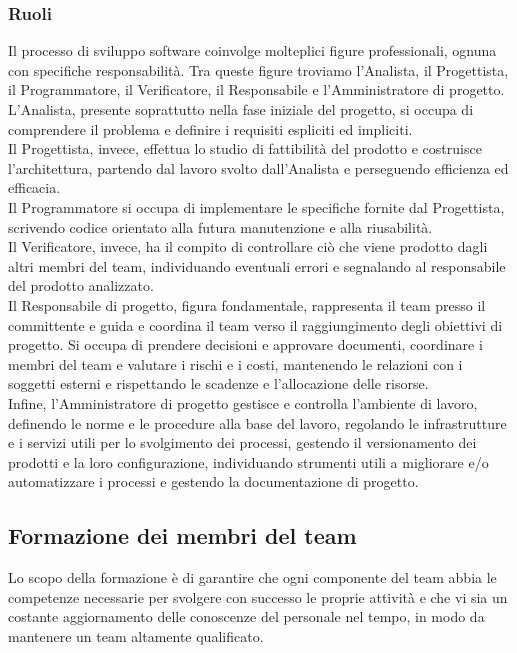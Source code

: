 \subsubsection{Ruoli}
Il processo di sviluppo software coinvolge molteplici figure professionali, ognuna con specifiche responsabilità. Tra queste figure troviamo l'Analista, il Progettista, il Programmatore, il Verificatore, il Responsabile e l'Amministratore di progetto. \\
L'Analista, presente soprattutto nella fase iniziale del progetto, si occupa di comprendere il problema e definire i requisiti espliciti ed impliciti. \\
Il Progettista, invece, effettua lo studio di fattibilità del prodotto e costruisce l'architettura, partendo dal lavoro svolto dall'Analista e perseguendo efficienza ed efficacia. \\
Il Programmatore si occupa di implementare le specifiche fornite dal Progettista, scrivendo codice orientato alla futura manutenzione e alla riusabilità. \\
Il Verificatore, invece, ha il compito di controllare ciò che viene prodotto dagli altri membri del team, individuando eventuali errori e segnalando al responsabile del prodotto analizzato. \\
Il Responsabile di progetto, figura fondamentale, rappresenta il team presso il committente e guida e coordina il team verso il raggiungimento degli obiettivi di progetto. Si occupa di prendere decisioni e approvare documenti, coordinare i membri del team e valutare i rischi e i costi, mantenendo le relazioni con i soggetti esterni e rispettando le scadenze e l'allocazione delle risorse. \\
Infine, l'Amministratore di progetto gestisce e controlla l'ambiente di lavoro, definendo le norme e le procedure alla base del lavoro, regolando le infrastrutture e i servizi utili per lo svolgimento dei processi, gestendo il versionamento dei prodotti e la loro configurazione, individuando strumenti utili a migliorare e/o automatizzare i processi e gestendo la documentazione di progetto. 

\subsection{Formazione dei membri del team}
Lo scopo della formazione è di garantire che ogni componente del team abbia le competenze necessarie per svolgere con successo le proprie attività e che vi sia un costante aggiornamento delle conoscenze del personale nel tempo, in modo da mantenere un team altamente qualificato.

